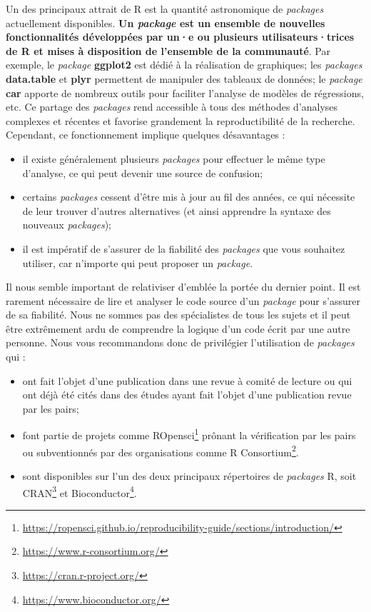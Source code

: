 \documentclass[
  11pt,
  french,
]{book}
\providecommand{\tightlist}{%
  \setlength{\itemsep}{0pt}\setlength{\parskip}{0pt}}
\renewcommand{\href}[2]{#2\footnote{\url{#1}}}
\begin{document}
Un des principaux attrait de R est la quantité astronomique de \emph{packages} actuellement disponibles. \textbf{Un \emph{package} est un ensemble de nouvelles fonctionnalités développées par un·e ou plusieurs utilisateurs·trices de R et mises à disposition de l'ensemble de la communauté}. Par exemple, le \emph{package} \textbf{ggplot2} est dédié à la réalisation de graphiques; les \emph{packages} \textbf{data.table} et \textbf{plyr} permettent de manipuler des tableaux de données; le \emph{package} \textbf{car} apporte de nombreux outils pour faciliter l'analyse de modèles de régressions, etc. Ce partage des \emph{packages} rend accessible à tous des méthodes d'analyses complexes et récentes et favorise grandement la reproductibilité de la recherche. Cependant, ce fonctionnement implique quelques désavantages :

\begin{itemize}
\tightlist
\item
  il existe généralement plusieurs \emph{packages} pour effectuer le même type d'analyse, ce qui peut devenir une source de confusion;
\item
  certains \emph{packages} cessent d'être mis à jour au fil des années, ce qui nécessite de leur trouver d'autres alternatives (et ainsi apprendre la syntaxe des nouveaux \emph{packages});
\item
  il est impératif de s'assurer de la fiabilité des \emph{packages} que vous souhaitez utiliser, car n'importe qui peut proposer un \emph{package}.
\end{itemize}

Il nous semble important de relativiser d'emblée la portée du dernier point. Il est rarement nécessaire de lire et analyser le code source d'un \emph{package} pour s'assurer de sa fiabilité. Nous ne sommes pas des spécialistes de tous les sujets et il peut être extrêmement ardu de comprendre la logique d'un code écrit par une autre personne. Nous vous recommandons donc de privilégier l'utilisation de \emph{packages} qui :

\begin{itemize}
\tightlist
\item
  ont fait l'objet d'une publication dans une revue à comité de lecture ou qui ont déjà été cités dans des études ayant fait l'objet d'une publication revue par les pairs;
\item
  font partie de projets comme \href{https://ropensci.github.io/reproducibility-guide/sections/introduction/}{ROpensci} prônant la vérification par les pairs ou subventionnés par des organisations comme \href{https://www.r-consortium.org/}{R Consortium}.
\item
  sont disponibles sur l'un des deux principaux répertoires de \emph{packages} R, soit \href{https://cran.r-project.org/}{CRAN} et \href{https://www.bioconductor.org/}{Bioconductor}.
\end{itemize}
\end{document}
